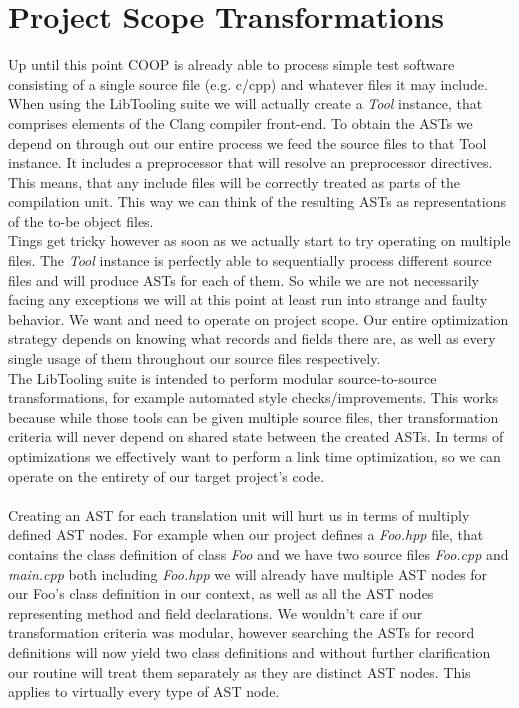 \chapter{Project Scope Transformations}\label{project_scope_transformations}
Up until this point COOP is already able to process simple test software consisting of a single source file (e.g. c/cpp) and whatever files it may include. When using the LibTooling suite we will actually create a \textit{Tool} instance, that comprises elements of the Clang compiler front-end. To obtain the ASTs we depend on through out our entire process we feed the source files to that Tool instance. It includes a preprocessor that will resolve an preprocessor directives. This means, that any include files will be correctly treated as parts of the compilation unit. This way we can think of the resulting ASTs as representations of the to-be object files.\\
Tings get tricky however as soon as we actually start to try operating on multiple files. The \textit{Tool} instance is perfectly able to sequentially process different source files and will produce ASTs for each of them. So while we are not necessarily facing any exceptions we will at this point at least run into strange and faulty behavior. We want and need to operate on project scope. Our entire optimization strategy depends on knowing what records and fields there are, as well as every single usage of them throughout our source files respectively.\\
The LibTooling suite is intended to perform modular source-to-source transformations, for example automated style checks/improvements. This works because while those tools can be given multiple source files, ther transformation criteria will never depend on shared state between the created ASTs. In terms of optimizations we effectively want to perform a link time optimization, so we can operate on the entirety of our target project's code.\\\\
Creating an AST for each translation unit will hurt us in terms of multiply defined AST nodes. For example when our project defines a \textit{Foo.hpp} file, that contains the class definition of class \textit{Foo} and we have two source files \textit{Foo.cpp} and \textit{main.cpp} both including \textit{Foo.hpp} we will already have multiple AST nodes for our Foo's class definition in our context, as well as all the AST nodes representing method and field declarations. We wouldn't care if our transformation criteria was modular, however searching the ASTs for record definitions will now yield two class definitions and without further clarification our routine will treat them separately as they are distinct AST nodes. This applies to virtually every type of AST node.\\
